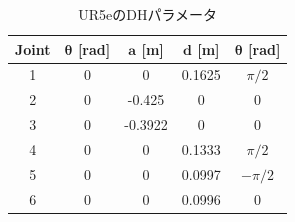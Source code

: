 \begin{table}[htbp]
    \centering
    \caption{UR5eのDHパラメータ}
    \label{tab:ur5e:dh}
    \begin{tabular}{ccccc}
        \hline
        \textbf{Joint} & $\bm{\theta}$ [rad] & $\bm{a}$ [m]& $\bm{d}$ [m]& $\bm{\theta}$ [rad]\\
        \hline
        1 & 0 & 0       & 0.1625 & $\pi/2$\\
        2 & 0 & -0.425  & 0       & 0\\
        3 & 0 & -0.3922 & 0       & 0\\
        4 & 0 & 0       & 0.1333 & $\pi/2$\\
        5 & 0 & 0       & 0.0997 & $-\pi/2$\\
        6 & 0 & 0       & 0.0996 & 0\\
        \hline
    \end{tabular}
\end{table}


